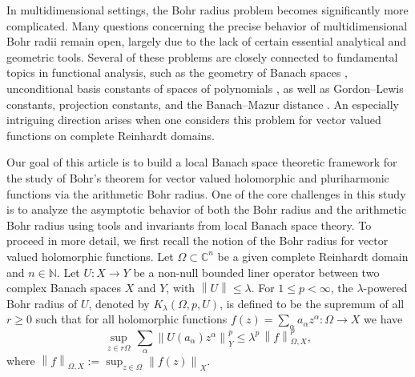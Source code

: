 \documentclass[a4paper,11pt, reqno]{amsart}
\theoremstyle{definition}
\newcommand{\norm}[1]{\left\lVert#1\right\rVert}
\begin{document}
	\par In multidimensional settings, the Bohr radius problem becomes significantly more complicated. Many questions concerning the precise behavior of multidimensional Bohr radii remain open, largely due to the lack of certain essential analytical and geometric tools. Several of these problems are closely connected to fundamental topics in functional analysis, such as the geometry of Banach spaces \cite{Blasco-Collect-2017,defant-2012}, unconditional basis constants of spaces of polynomials \cite{aizenberg-2001a}, as well as Gordon–Lewis constants, projection constants, and the Banach–Mazur distance \cite{defant-2003}.
	 An especially intriguing direction arises when one considers this problem for vector valued functions on complete Reinhardt domains.
	\par	
	Our goal of this article is to build a local Banach space theoretic framework for the study of Bohr's theorem for vector valued holomorphic and pluriharmonic functions via the arithmetic Bohr radius. One of the core challenges in this study is to analyze the asymptotic behavior of both the Bohr radius and the arithmetic Bohr radius using tools and invariants from local Banach space theory. To proceed in more detail, we first recall the notion of the Bohr radius for vector valued holomorphic functions.
	Let $\Omega \subset \mathbb{C}^n$ be a given complete Reinhardt domain and $n \in \mathbb{N}$. Let $U:X\rightarrow Y$ be a non-null bounded liner operator between two complex Banach spaces $X$ and $Y$, with $\norm{U} \leq \lambda$. For $1 \leq p < \infty$, the $\lambda$-powered Bohr radius of $U$, denoted by $K_{\lambda}(\Omega, p,U)$, is defined to be the supremum of all $r\geq 0$ such that for all holomorphic functions $f(z)=\sum_{\alpha}a_{\alpha}z^{\alpha}:\Omega \rightarrow X$ we have 
	\begin{equation} \label{e-1.2}
		\sup_{z \in r\Omega}\, \sum_{\alpha} \norm{U(a_{\alpha})z^\alpha}^p_{Y} \leq \lambda^p\,\norm{f}^p_{\Omega,X}, 
	\end{equation}
	where $\norm{f}_{\Omega,X}:=\sup_{z \in \Omega}\norm{f(z)}_{X}$. 
	\vspace{2mm}
	
\end{document}
